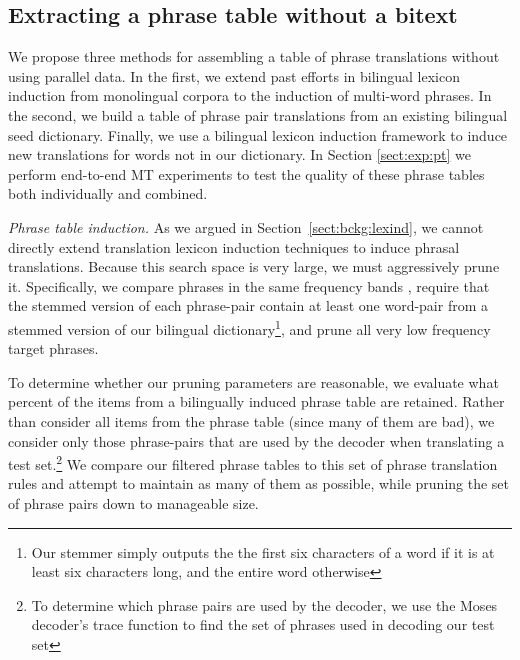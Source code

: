 \documentclass[11pt]{article}
\newcommand{\mnote}[1]{\marginpar{%
  \vskip-\baselineskip
  \raggedright\footnotesize
  \itshape\hrule\smallskip\tiny{#1}\par\smallskip\hrule}}
\newcommand{\mtodo}[1]{\mnote{\textcolor{red}{#1}}}
\newcommand{\todo}[1]{\textcolor{red}{TODO: #1}}
\newcommand{\secref}[1]{Section~\ref{#1}}
\newcommand{\paraheader}[1]{\vskip 0.08in \noindent\emph{#1}}
\begin{document}
\subsection{Extracting a phrase table without a bitext}  \label{sect:extract}
We propose three methods for assembling a table of phrase translations without using parallel data. In the first, we extend past efforts in bilingual lexicon induction from monolingual corpora to the induction of multi-word phrases. In the second, we build a table of phrase pair translations from an existing bilingual seed dictionary. Finally, we use a bilingual lexicon induction framework to induce new translations for words not in our dictionary. In Section \ref{sect:exp:pt} we perform end-to-end MT experiments to test the quality of these phrase tables both individually and combined.

\paraheader{Phrase table induction.} As we argued in \secref{sect:bckg:lexind}, we cannot directly extend translation lexicon induction techniques to induce phrasal translations.  Because this search space is very large, we must aggressively prune it.   Specifically, we compare phrases in the same frequency bands \cite{Uszkoreit:2010}, require that the stemmed version of each phrase-pair contain at least one word-pair from a stemmed version of our bilingual dictionary\footnote{Our stemmer simply outputs the the first six characters of a word if it is at least six characters long, and the entire word otherwise}, and prune all very low frequency target phrases. %

To determine whether our pruning parameters are reasonable, we evaluate what percent of the items from a bilingually induced phrase table are retained.  Rather than consider all items from the phrase table (since many of them are bad), we consider only those phrase-pairs that are used by the decoder when translating a test set.\footnote{To determine which phrase pairs are used by the decoder, we use the Moses decoder's trace function to find the set of phrases used in decoding our test set} We compare our filtered phrase tables to this set of phrase translation rules and attempt to maintain as many of them as possible, while pruning the set of phrase pairs down to manageable size.
\end{document}

